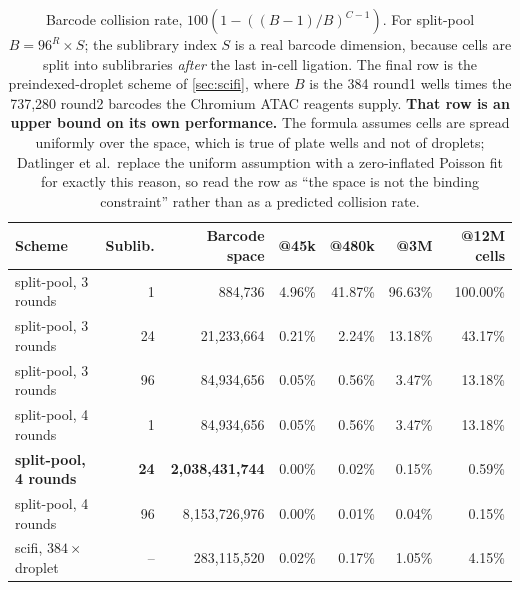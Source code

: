 \begin{table}[htbp]\centering
\footnotesize
\caption[]{Barcode collision rate, $100(1-((B-1)/B)^{C-1})$. For split-pool $B=96^{R}\times S$; the sublibrary index $S$ is a real barcode dimension, because cells are split into sublibraries \emph{after} the last in-cell ligation. The final row is the preindexed-droplet scheme of \cref{sec:scifi}, where $B$ is the 384 round1 wells times the 737{,}280 round2 barcodes the Chromium ATAC reagents supply. \textbf{That row is an upper bound on its own performance.} The formula assumes cells are spread uniformly over the space, which is true of plate wells and not of droplets; Datlinger et al.\ replace the uniform assumption with a zero-inflated Poisson fit for exactly this reason, so read the row as ``the space is not the binding constraint'' rather than as a predicted collision rate.}\label{tab:barcode}
\begin{tabular}{lrrrrrr}
\toprule
Scheme & Sublib. & Barcode space & @45k & @480k & @3M & @12M cells \\
\midrule
split-pool, 3 rounds & 1 & 884{,}736 & 4.96\% & 41.87\% & 96.63\% & 100.00\% \\
split-pool, 3 rounds & 24 & 21{,}233{,}664 & 0.21\% & 2.24\% & 13.18\% & 43.17\% \\
split-pool, 3 rounds & 96 & 84{,}934{,}656 & 0.05\% & 0.56\% & 3.47\% & 13.18\% \\
split-pool, 4 rounds & 1 & 84{,}934{,}656 & 0.05\% & 0.56\% & 3.47\% & 13.18\% \\
\textbf{split-pool, 4 rounds} & \textbf{24} & \textbf{2{,}038{,}431{,}744} & 0.00\% & 0.02\% & 0.15\% & 0.59\% \\
split-pool, 4 rounds & 96 & 8{,}153{,}726{,}976 & 0.00\% & 0.01\% & 0.04\% & 0.15\% \\
scifi, $384\times$droplet & -- & 283{,}115{,}520 & 0.02\% & 0.17\% & 1.05\% & 4.15\% \\
\bottomrule
\end{tabular}
\end{table}
